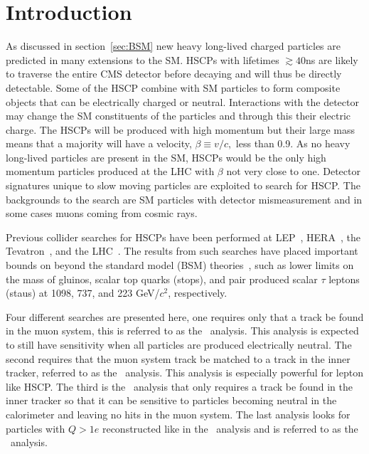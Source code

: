 \section{Introduction}
As discussed in section~\ref{sec:BSM} new heavy long-lived charged particles are predicted in many extensions to the SM. HSCPs with
lifetimes $\gtrsim 40$ns are likely to traverse the entire CMS detector before decaying and will thus be directly detectable.
Some of the HSCP combine with SM particles to form composite objects that can be electrically charged or neutral.
Interactions with the detector may change the SM constituents of the particles and through this their electric charge.
The HSCPs will be produced with high momentum but their large mass means that
a majority will have a velocity, $\beta \equiv v/c,$ less than 0.9. 
As no heavy long-lived particles are present in the SM, HSCPs would be the only high momentum particles produced at the LHC with $\beta$ not very close to one.
Detector signatures unique to slow moving particles are exploited to search for HSCP. 
The backgrounds to the search are SM particles with detector mismeasurement and in some cases
muons coming from cosmic rays.

Previous collider searches for HSCPs have been performed at LEP~\cite{Barate:1997dr, Abreu:2000tn, Achard:2001qw, Abbiendi:2003yd}, HERA~\cite{Aktas:2004pq},
the Tevatron~\cite{Abazov:2008qu, Aaltonen:2009kea, Abazov:2011pf,Abazov:2012ab},
and the LHC~\cite{Khachatryan:2011ts, Aad:2011mb,  Aad:2011yf, Aad:2011hz, Chatrchyan::2012dr, Chatrchyan:2012sp, Aad:2012vd, ATLASmCHAMPs}.
The results from such searches have placed important bounds on beyond the standard model (BSM) theories~\cite{Berger:2008cq, CahillRowley:2012kx}, such as lower limits on the
mass of gluinos, scalar top quarks (stops), and pair produced scalar $\tau$ leptons (staus) at 1098,
737, and 223 GeV/$c^2$, respectively.

Four different searches are presented here, one requires only that a track be found in the muon system, this is referred to as the \muononly\ analysis. 
This analysis is expected to still have sensitivity when all particles are produced electrically neutral. The
second requires that the muon system track be matched to a track in the inner tracker, referred to as the \tktof\ analysis. This analysis is especially
powerful for lepton like HSCP. The third is the \tkonly\ analysis that only requires a track be found in the inner tracker so that it can be sensitive to particles
becoming neutral in the calorimeter and leaving no hits in the muon system. The last analysis looks for particles with $Q > 1e$ reconstructed
like in the \tktof\ analysis and is referred to as the \multi\ analysis.

